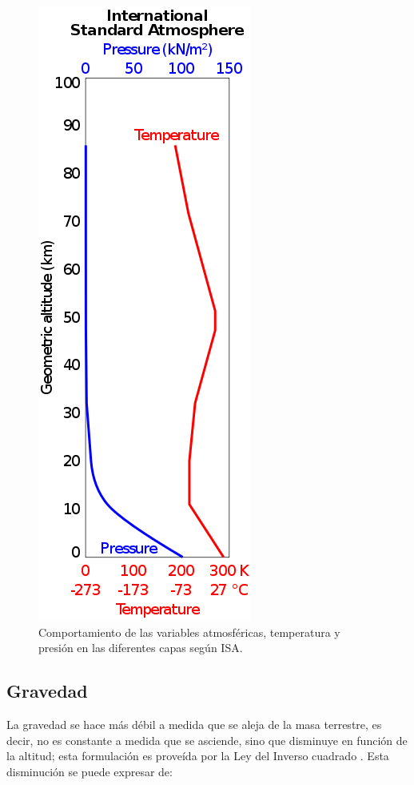 \begin{figure}[h]
    \centering
    \includegraphics[scale=0.45]{document/figures/02_International_Standard_Atmosphere.png}
    \caption{Comportamiento de las variables  atmosféricas, temperatura y presión en las diferentes capas según ISA.}
    \label{fig:generalidad_ISA}
\end{figure}


\subsection{Gravedad}

La gravedad se hace más débil a medida que se aleja de la masa terrestre, es decir, no es constante a medida que se asciende, sino que disminuye en función de la altitud; esta formulación es proveída por la Ley del Inverso cuadrado  \cite{isa_1976}. Esta disminución se puede expresar de:

